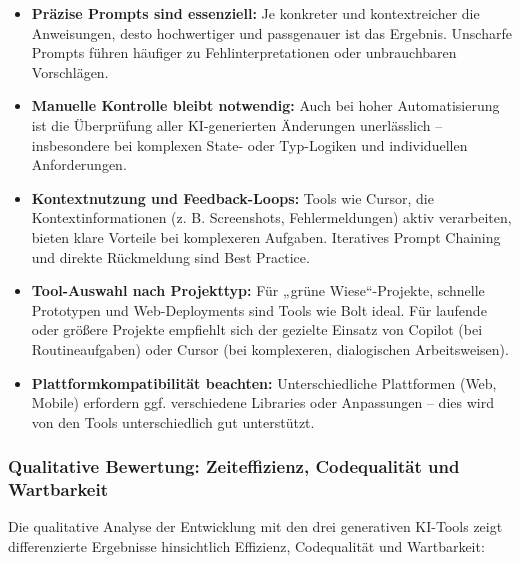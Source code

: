 \begin{itemize}
    \item \textbf{Präzise Prompts sind essenziell:} Je konkreter und kontextreicher die Anweisungen, desto hochwertiger und passgenauer ist das Ergebnis. Unscharfe Prompts führen häufiger zu Fehlinterpretationen oder unbrauchbaren Vorschlägen.
    \item \textbf{Manuelle Kontrolle bleibt notwendig:} Auch bei hoher Automatisierung ist die Überprüfung aller KI-generierten Änderungen unerlässlich – insbesondere bei komplexen State- oder Typ-Logiken und individuellen Anforderungen.
    \item \textbf{Kontextnutzung und Feedback-Loops:} Tools wie Cursor, die Kontextinformationen (z. B. Screenshots, Fehlermeldungen) aktiv verarbeiten, bieten klare Vorteile bei komplexeren Aufgaben. Iteratives Prompt Chaining und direkte Rückmeldung sind Best Practice.
    \item \textbf{Tool-Auswahl nach Projekttyp:} Für „grüne Wiese“-Projekte, schnelle Prototypen und Web-Deployments sind Tools wie Bolt ideal. Für laufende oder größere Projekte empfiehlt sich der gezielte Einsatz von Copilot (bei Routineaufgaben) oder Cursor (bei komplexeren, dialogischen Arbeitsweisen).
    \item \textbf{Plattformkompatibilität beachten:} Unterschiedliche Plattformen (Web, Mobile) erfordern ggf. verschiedene Libraries oder Anpassungen – dies wird von den Tools unterschiedlich gut unterstützt.
\end{itemize}

\subsubsection{Qualitative Bewertung: Zeiteffizienz, Codequalität und Wartbarkeit}

Die qualitative Analyse der Entwicklung mit den drei generativen KI-Tools zeigt
differenzierte Ergebnisse hinsichtlich Effizienz, Codequalität und Wartbarkeit:

